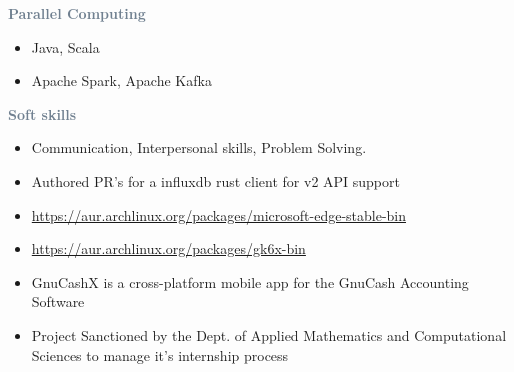 \documentclass[10pt,a4paper,ragged2e,withhyper]{altacv}
\begin{document}
\begin{paracol}{2}
\textcolor{SlateGrey}{\textbf{Parallel Computing}}
\newline

\begin{itemize}
    \item Java, Scala 
    \item Apache Spark, Apache Kafka
\end{itemize}

\textcolor{SlateGrey}{\textbf{Soft skills}}
\newline

\begin{itemize}
    \item Communication, Interpersonal skills, Problem Solving.
\end{itemize}



\begin{itemize}
    \item Authored PR's for a influxdb rust client for v2 API support
\end{itemize}

\divider

\begin{itemize}
    \item {\url{https://aur.archlinux.org/packages/microsoft-edge-stable-bin}}
    \item {\url{https://aur.archlinux.org/packages/gk6x-bin}}
\end{itemize}

\divider

\begin{itemize}
    \item GnuCashX is a cross-platform mobile app for the GnuCash Accounting Software
\end{itemize}

\divider

\begin{itemize}
    \item Project Sanctioned by the Dept. of Applied Mathematics and Computational Sciences to manage it's internship process
\end{itemize}


\end{paracol}
\end{document}
